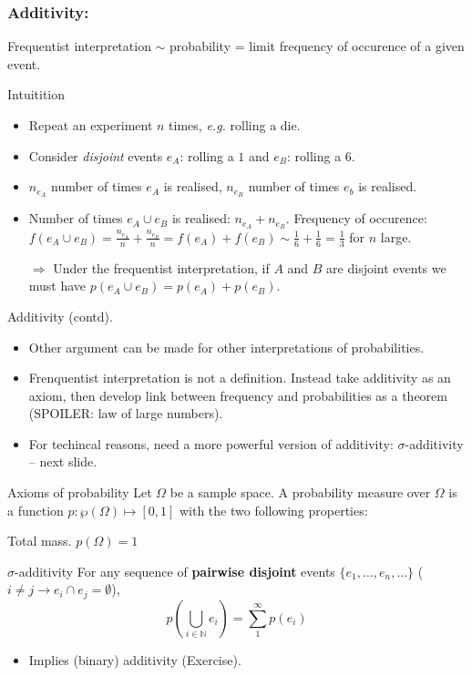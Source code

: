 \documentclass{beamer}
\begin{document}
\begin{frame}
  \frametitle{Additivity:}
  Frequentist interpretation $\sim$ probability = limit frequency of occurence of a given event.

  \begin{exampleblock}{Intuitition}
    \begin{itemize}
    \item Repeat an experiment $n$ times, \emph{e.g.} rolling a die.
    \item Consider \emph{disjoint} events $e_A$: rolling a $1$ and $e_B$: rolling a $6$.
    \item $n_{e_A}$ number of times $e_A$ is realised, $n_{e_B}$ number of times $e_b$ is realised.
    \item Number of times $e_A \cup e_B$ is realised: $n_{e_A} + n_{e_B}$. Frequency of occurence: $f(e_A \cup e_B) = \frac{n_{e_A}}{n} + \frac{n_{e_B}}{n} = f(e_A) + f(e_B) \sim \frac{1}{6} + \frac{1}{6} = \frac{1}{3}$ for $n$ large.
    \item[$\Rightarrow$] \alert{Under the frequentist interpretation, if $A$ and $B$ are disjoint events we must have $p(e_A \cup e_B) = p(e_A) + p(e_B)$.}
    \end{itemize}
  \end{exampleblock}
\end{frame}

\begin{frame}{Additivity (contd).}
  \begin{itemize}
  \item Other argument can be made for other interpretations of probabilities.
  \item Frenquentist interpretation is not a definition. Instead take additivity as an axiom, then develop link between frequency and probabilities as a theorem (SPOILER: law of large numbers).
  \item For techincal reasons, need a more powerful version of additivity: $\sigma$-additivity -- next slide.
  \end{itemize}
\end{frame}


\begin{frame}{Axioms of probability}
  Let $\Omega$ be a sample space. A probability measure over $\Omega$ is a function $p: \wp(\Omega) \mapsto [0,1]$ with the two following properties:

  \begin{block}{Total mass.}
    $p(\Omega) = 1$
  \end{block}

  \begin{block}{$\sigma$-additivity}
    For any sequence of {\bf pairwise disjoint} events $\{e_1, \dots, e_n, \dots\}$ ($i \neq j \rightarrow e_i \cap e_j = \emptyset$),
    \[p(\bigcup_{i \in \mathbb{N}} e_i) = \sum^{\infty}_{1} p(e_i) \]
    \begin{itemize}
    \item Implies (binary) additivity (Exercise).
    \end{itemize}
  \end{block}
\end{frame}
\end{document}
